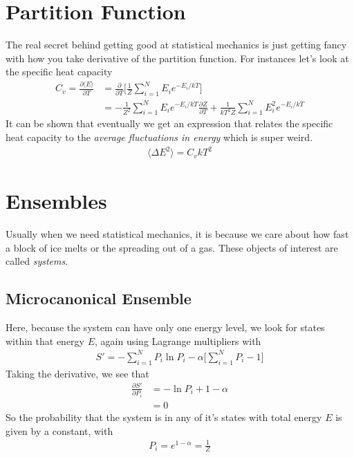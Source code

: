 \section{Partition Function}
The real secret behind getting good at statistical mechanics is just getting fancy with how you take derivative of the partition function. For instances let's look at the specific heat capacity
\begin{align}
    C_v = \frac{\partial \langle E\rangle}{\partial T} &= \frac{\partial}{\partial T}\Big[\frac{1}{Z}\sum_{i=1}^N E_i e^{-E_i/kT}\Big]\\
    &= -\frac{1}{Z^2}\sum_{i=1}^N E_i e^{-E_i/kT}\frac{\partial Z}{\partial T} + \frac{1}{kT^2Z}\sum_{i=1}^N E_i^2 e^{-E_i/kT}
\end{align}
It can be shown that eventually we get an expression that relates the specific heat capacity to the \emph{average fluctuations in energy} which is super weird.
\begin{align}
    \langle \Delta E^2\rangle= C_vkT^2 
\end{align}

\section{Ensembles}
Usually when we need statistical mechanics, it is because we care about how fast a block of ice melts or the spreading out of a gas. These objects of interest are called \emph{systems}. %

\subsection{Microcanonical Ensemble}
Here, because the system can have only one energy level, we look for states within that energy $E$, again using Lagrange multipliers with
\begin{align}
    S' = -\sum_{i=1}^N P_i\ln P_i - \alpha\Big[\sum_{i=1}^N P_i -1\Big]
\end{align}
Taking the derivative, we see that
\begin{align}
    \frac{\partial S'}{\partial P_i} &= -\ln P_i  + 1 -\alpha\\
 &= 0 
\end{align}
So the probability that the system is in any of it's states with total energy $E$ is given by a constant, with
\begin{align}
    P_i = e^{1-\alpha} = \frac{1}{Z}
\end{align}

